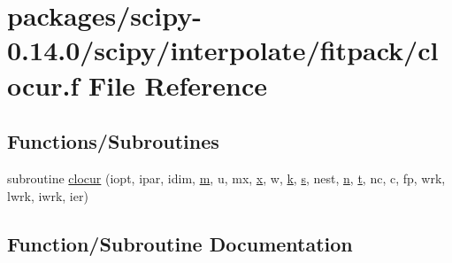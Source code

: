 \hypertarget{clocur_8f}{}\section{packages/scipy-\/0.14.0/scipy/interpolate/fitpack/clocur.f File Reference}
\label{clocur_8f}
\subsection*{Functions/\+Subroutines}
\begin{DoxyCompactItemize}
\item 
subroutine \hyperlink{clocur_8f_a945a06895db17bd39d4f60daf73f02ac}{clocur} (iopt, ipar, idim, \hyperlink{indexexpr_8h_ab72fdb4031d47b75ab26dd18a437bcdc}{m}, u, mx, \hyperlink{vecnorm1_8cc_ac73eed9e41ec09d58f112f06c2d6cb63}{x}, w, \hyperlink{indexexpr_8h_abb72938a198351550846b37a84588b63}{k}, \hyperlink{indexexpr_8h_ae024b0db549122b44c349ae28ec990dc}{s}, nest, \hyperlink{indexexpr_8h_ab427e2e2b4d6cec55fa088ea2a692ace}{n}, \hyperlink{indexexpr_8h_a01709998b82be3f34e0412206618d09d}{t}, nc, c, fp, wrk, lwrk, iwrk, ier)
\end{DoxyCompactItemize}


\subsection{Function/\+Subroutine Documentation}
\hypertarget{clocur_8f_a945a06895db17bd39d4f60daf73f02ac}{}
